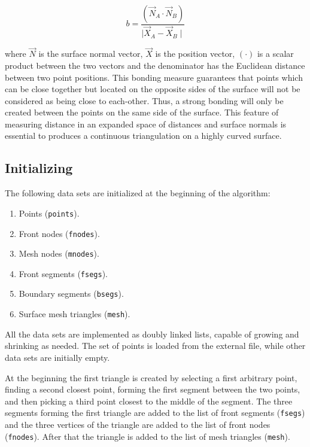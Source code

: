 \documentclass[12pt]{article}
\begin{document}
\begin{equation}
\label{bond}
b = \frac{(\vec{N}_A\cdot\vec{N}_B)}{\mid\vec{X}_A-\vec{X}_B\mid}
\end{equation}

\nd
where $\vec{N}$ is the surface normal vector, $\vec{X}$ is the position vector,
$(\cdot)$ is a scalar product between the two vectors and the denominator has the Euclidean
distance between two point positions.  This bonding measure guarantees that
points which can be close together but located on the opposite sides of the
surface will not be considered as being close to each-other.  Thus, a strong
bonding will only be created between the points on the same side of the
surface.  This feature of measuring distance in an expanded space of distances
and surface normals is essential to produces a continuous triangulation on a
highly curved surface.


\subsection{Initializing}

The following data sets are initialized at the beginning of the algorithm:

\begin{enumerate}
\item Points ({\tt points}).
\item Front nodes ({\tt fnodes}).
\item Mesh nodes ({\tt mnodes}).
\item Front segments ({\tt fsegs}).
\item Boundary segments ({\tt bsegs}).
\item Surface mesh triangles ({\tt mesh}).
\end{enumerate}

All the data sets are implemented as doubly linked lists, capable of growing and shrinking as needed. 
The set of points is loaded from the external file, while other data sets are initially empty. 

At the beginning the first triangle is created by selecting a first arbitrary point, finding a second closest point, forming the first segment between the two points, and then picking a third point closest to the middle of the segment.
The three segments forming the first triangle are added to the list of front
segments ({\tt fsegs}) and the three vertices of the triangle are added to the list of front nodes ({\tt fnodes}). After that the triangle is added to the list of mesh triangles ({\tt mesh}).
\end{document}
